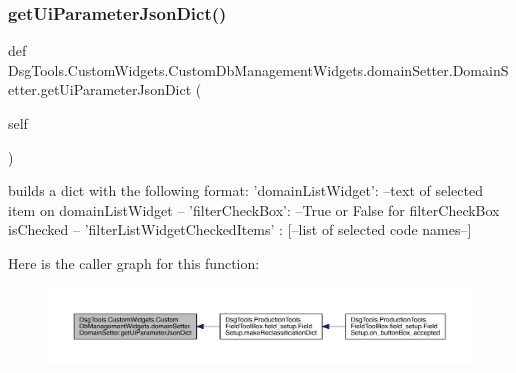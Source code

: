\subsubsection{\texorpdfstring{get\+Ui\+Parameter\+Json\+Dict()}{getUiParameterJsonDict()}}
{\footnotesize\ttfamily def Dsg\+Tools.\+Custom\+Widgets.\+Custom\+Db\+Management\+Widgets.\+domain\+Setter.\+Domain\+Setter.\+get\+Ui\+Parameter\+Json\+Dict (\begin{DoxyParamCaption}\item[{}]{self }\end{DoxyParamCaption})}

\begin{DoxyVerb}builds a dict with the following format:
{
    'domainListWidget': --text of selected item on domainListWidget --
    'filterCheckBox': --True or False for filterCheckBox isChecked --
    'filterListWidgetCheckedItems' : [--list of selected code names--]
}
\end{DoxyVerb}
 Here is the caller graph for this function\+:
\nopagebreak
\begin{figure}[H]
\begin{center}
\leavevmode
\includegraphics[width=350pt]{class_dsg_tools_1_1_custom_widgets_1_1_custom_db_management_widgets_1_1domain_setter_1_1_domain_setter_a400d7ff6dad32ea35f1cb8346e90f242_icgraph}
\end{center}
\end{figure}
\mbox{\label{class_dsg_tools_1_1_custom_widgets_1_1_custom_db_management_widgets_1_1domain_setter_1_1_domain_setter_a337fd2044f8173c552c7a557c5c44791}} 
